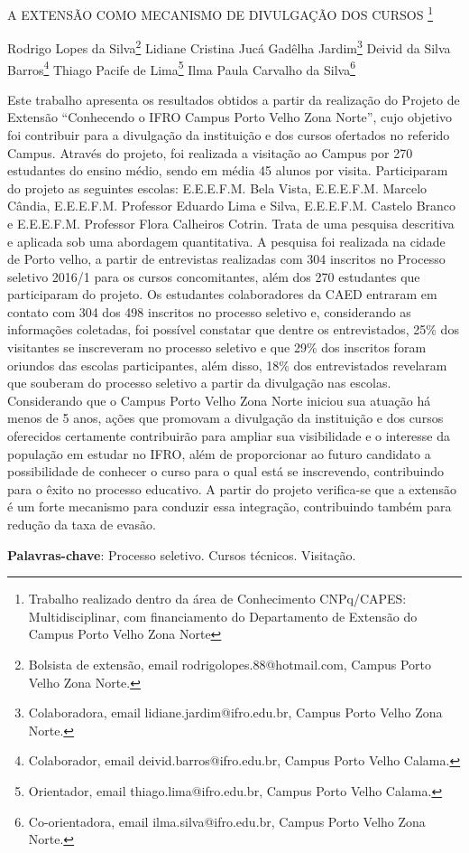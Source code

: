 \documentclass[article,12pt,onesidea,4paper,english,brazil]{abntex2}
\begin{document}
	
	
	\frenchspacing 
	
	\begin{center}
		\LARGE A EXTENSÃO COMO MECANISMO DE DIVULGAÇÃO DOS CURSOS \footnote{Trabalho realizado dentro da área de Conhecimento CNPq/CAPES: Multidisciplinar, com financiamento do Departamento de Extensão do Campus Porto Velho Zona Norte}
		
		\normalsize
		Rodrigo Lopes da Silva\footnote{Bolsista de extensão, email rodrigolopes.88@hotmail.com, Campus Porto Velho Zona Norte.} 
		Lidiane Cristina Jucá Gadêlha Jardim\footnote{Colaboradora, email  lidiane.jardim@ifro.edu.br, Campus Porto Velho Zona Norte.} 
		Deivid da Silva Barros\footnote{Colaborador, email  deivid.barros@ifro.edu.br, Campus Porto Velho Calama.} 
		Thiago Pacife de Lima\footnote{Orientador, email thiago.lima@ifro.edu.br, Campus Porto Velho Calama.} 
		Ilma Paula Carvalho da Silva\footnote{Co-orientadora, email ilma.silva@ifro.edu.br, Campus Porto Velho Zona Norte.}
	\end{center}
	
	\noindent Este trabalho apresenta os resultados obtidos a partir da realização do Projeto de Extensão “Conhecendo o IFRO Campus Porto Velho Zona Norte”, cujo objetivo foi contribuir para a divulgação da instituição e dos cursos ofertados no referido Campus. Através do projeto, foi realizada a visitação ao Campus por 270 estudantes do ensino médio, sendo em média 45 alunos por visita. Participaram do projeto as seguintes escolas: E.E.E.F.M. Bela Vista, E.E.E.F.M. Marcelo Cândia, E.E.E.F.M.  Professor Eduardo Lima e Silva, E.E.E.F.M.  Castelo Branco e E.E.E.F.M.  Professor Flora Calheiros Cotrin. Trata de uma pesquisa descritiva e aplicada sob uma abordagem quantitativa. A pesquisa foi realizada na cidade de Porto velho, a partir de entrevistas realizadas com 304 inscritos no Processo seletivo 2016/1 para os cursos concomitantes, além dos 270 estudantes que participaram do projeto. Os estudantes colaboradores da CAED entraram em contato com 304 dos 498 inscritos no processo seletivo e, considerando as informações coletadas, foi possível constatar que dentre os entrevistados, 25\% dos visitantes se inscreveram no processo seletivo e que 29\% dos inscritos foram oriundos das escolas participantes, além disso, 18\% dos entrevistados revelaram que souberam do processo seletivo a partir da divulgação nas escolas. Considerando que o Campus Porto Velho Zona Norte iniciou sua atuação há menos de 5 anos, ações que promovam a divulgação da instituição e dos cursos oferecidos certamente contribuirão para ampliar sua visibilidade e o interesse da população em estudar no IFRO, além de proporcionar ao futuro candidato a possibilidade de conhecer o curso para o qual está se inscrevendo, contribuindo para o êxito no processo educativo. A partir do projeto verifica-se que a extensão é um forte mecanismo para conduzir essa integração, contribuindo também para redução da taxa de evasão.
	
	\vspace{\onelineskip}
	
	\noindent
	\textbf{Palavras-chave}: Processo seletivo. Cursos técnicos. Visitação.
	
\end{document}
